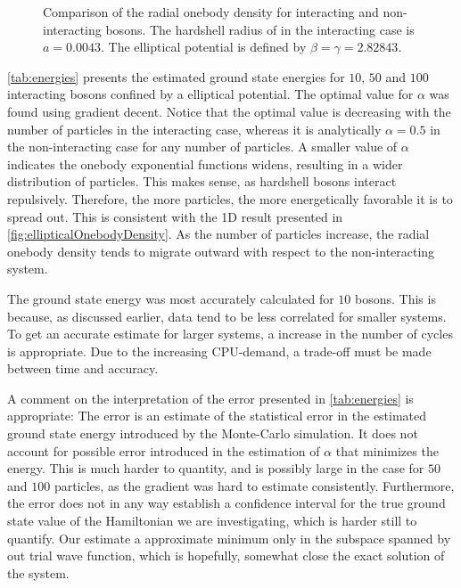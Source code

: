 \begin{figure}
\begin{subfigure}{\textwidth}
	\end{subfigure}%
	\centering
	\caption{Comparison of the radial onebody density for interacting and non-interacting bosons. The hardshell radius of in the interacting case is $a = 0.0043$. The elliptical potential is defined by $\beta = \gamma =  2.82843$. }
	\label{fig:ellipticalOnebodyDensity}
\end{figure}

\autoref{tab:energies} presents the estimated ground state energies for $10$,
$50$ and $100$ interacting bosons confined by a elliptical potential. The
optimal value for $\alpha$ was found using gradient decent. Notice that the
optimal value is decreasing with the number of particles in the interacting
case, whereas it is analytically $\alpha = 0.5$ in the non-interacting case for
any number of particles. A smaller value of $\alpha$ indicates the onebody
exponential functions widens, resulting in a wider distribution of particles.
This makes sense, as hardshell bosons interact repulsively. Therefore, the more
particles, the more energetically favorable it is to spread out. This is
consistent with the 1D result presented in
\autoref{fig:ellipticalOnebodyDensity}. As the number of particles increase, the
radial onebody density tends to migrate outward with respect to the
non-interacting system.


The ground state energy was most accurately calculated for $10$ bosons. This is
because, as discussed earlier, data tend to be less correlated for smaller
systems. To get an accurate estimate for larger systems, a increase in the number
of cycles is appropriate. Due to the increasing CPU-demand, a trade-off must be
made between time and accuracy.


A comment on the interpretation of the error presented in \autoref{tab:energies} is appropriate:
The error is an estimate of the statistical error in the estimated ground state
energy introduced by the Monte-Carlo simulation. It does not account for
possible error introduced in the estimation of $\alpha$ that minimizes the
energy. This is much harder to quantity, and is possibly large in the case for
$50$ and $100$ particles, as the gradient was hard to estimate consistently.
Furthermore, the error does not in any way establish a confidence interval for
the true ground state value of the Hamiltonian we are investigating, which is
harder still to quantify. Our estimate a approximate minimum only in the
subspace spanned by out trial wave function, which is hopefully, somewhat close
the exact solution of the system.








